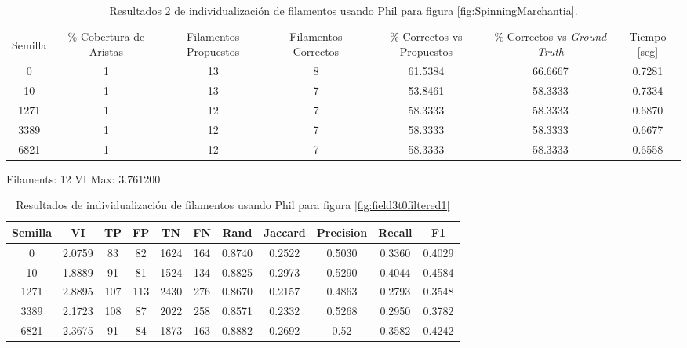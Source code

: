 \begin{table}[h]
    \centering
    \begin{tabular}{|c|c|c|c|c|c|c|}
    \hline
         & \multirow{4}{2cm}{\centering \% Cobertura de Aristas} & \multirow{4}{2cm}{Filamentos Propuestos} & \multirow{4}{2cm}{Filamentos Correctos} & \multirow{4}{2.5cm}{\% Correctos vs Propuestos} & \multirow{4}{2.5cm}{\centering \% Correctos vs {\it Ground Truth}} & \multirow{4}{1.2cm}{\centering Tiempo [seg]} \\
         &  &  &  & & &  \\
        Semilla &  &  &  & & &  \\
        &  &  &  & & &  \\ \hline 
        0 & 1 & 13 & 8 & 61.5384 & 66.6667 & 0.7281  \\
        10 & 1 & 13 & 7 & 53.8461 & 58.3333 & 0.7334\\
        1271 & 1 & 12 & 7 & 58.3333 & 58.3333 & 0.6870\\
        3389 & 1 & 12 & 7 & 58.3333 & 58.3333 & 0.6677\\
        6821 & 1 & 12 & 7 & 58.3333 & 58.3333 & 0.6558\\
        \hline
    \end{tabular}
    \caption{Resultados 2 de individualizaci\'on de filamentos usando Phil para figura \ref{fig:SpinningMarchantia}.}
    \label{tab:SpinningMarchantiaResults2}
\end{table}


Filaments: 12	VI Max: 3.761200
\begin{table}[h]
    \centering
    \begin{tabular}{|c|c|c|c|c|c|c|c|c|c|c|}
    \hline
        Semilla & VI & TP & FP &TN &FN & Rand	& Jaccard &	Precision &	Recall &	F1 \\ \hline 
        0    & 2.0759 & 83  & 82  & 1624 & 164 & 0.8740  & 0.2522  & 0.5030  & 0.3360 & 0.4029 \\
        10   & 1.8889  & 91  & 81  & 1524 & 134 & 0.8825 & 0.2973 & 0.5290  & 0.4044 & 0.4584 \\
        1271 & 2.8895 & 107 & 113 & 2430 & 276 & 0.8670 & 0.2157 & 0.4863 & 0.2793 & 0.3548\\
        3389 & 2.1723 & 108 & 87  & 2022 & 258 & 0.8571 & 0.2332 & 0.5268 & 0.2950 & 0.3782\\
        6821 & 2.3675 & 91  & 84  & 1873 & 163 & 0.8882 & 0.2692 & 0.52     & 0.3582 & 0.4242\\
        \hline
    \end{tabular}
    \caption{Resultados de individualizaci\'on de filamentos usando Phil para figura \ref{fig:field3t0filtered1}}
    \label{tab:field3t0filteredResults1}
\end{table}

